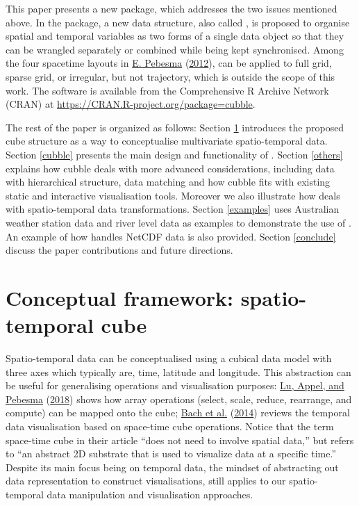 \documentclass{article}
\begin{document}
This paper presents a new  package,  which addresses the two issues mentioned above. In the package, a new data structure, also called , is proposed to organise spatial and temporal variables as two forms of a single data object so that they can be wrangled separately or combined while being kept synchronised. Among the four spacetime layouts in \protect\hyperlink{ref-spacetime}{E. Pebesma} (\protect\hyperlink{ref-spacetime}{2012}),  can be applied to full grid, sparse grid, or irregular, but not trajectory, which is outside the scope of this work. The software is available from the Comprehensive R Archive Network (CRAN) at \url{https://CRAN.R-project.org/package=cubble}.

The rest of the paper is organized as follows: Section \ref{cube} introduces the proposed cube structure as a way to conceptualise multivariate spatio-temporal data. Section \ref{cubble} presents the main design and functionality of . Section \ref{others} explains how cubble deals with more advanced considerations, including data with hierarchical structure, data matching and how cubble fits with existing static and interactive visualisation tools. Moreover we also illustrate how  deals with spatio-temporal data transformations. Section \ref{examples} uses Australian weather station data and river level data as examples to demonstrate the use of . An example of how  handles NetCDF data is also provided. Section \ref{conclude} discuss the paper contributions and future directions.

\hypertarget{cube}{%
\section{Conceptual framework: spatio-temporal cube}\label{cube}}

Spatio-temporal data can be conceptualised using a cubical data model with three axes which typically are, time, latitude and longitude. This abstraction can be useful for generalising operations and visualisation purposes: \protect\hyperlink{ref-lu_multidimensional_2018}{Lu, Appel, and Pebesma} (\protect\hyperlink{ref-lu_multidimensional_2018}{2018}) shows how array operations (select, scale, reduce, rearrange, and compute) can be mapped onto the cube; \protect\hyperlink{ref-bach_review_2014}{Bach et al.} (\protect\hyperlink{ref-bach_review_2014}{2014}) reviews the temporal data visualisation based on space-time cube operations. Notice that the term space-time cube in their article ``does not need to involve spatial data,'' but refers to ``an abstract 2D substrate that is used to visualize data at a specific time.'' Despite its main focus being on temporal data, the mindset of abstracting out data representation to construct visualisations, still applies to our spatio-temporal data manipulation and visualisation approaches.
\end{document}
